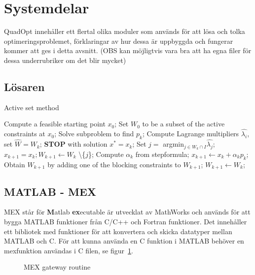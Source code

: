 \section{Systemdelar}
QuadOpt innehåller ett flertal olika moduler som används för att lösa och tolka optimeringsproblemet, förklaringar av hur dessa är uppbyggda och fungerar kommer att ges i detta avsnitt.
(OBS kan möjligtvis vara bra att ha egna filer för dessa underrubriker om det blir mycket)

\subsection{Lösaren}

\begin{algorithm}[H]
\caption{Active set method}
\label{alg:activeset}
\begin{algorithmic}
\State Compute a feasible starting point $x_0$;
\State Set $W_0$ to be a subset of the active constraints at $x_0$;
	\State Solve subproblem to find $p_k$;
		\State Compute Lagrange multipliers $\hat{\lambda_i}$,
		\State set $\hat{W} = W_k$; 
			\State \textbf{STOP} with solution $x^* = x_k$;
		\Else
			\State Set $j =$ argmin$_{j \in W_k \cap I}\hat{\lambda_j}$;
			\State $x_{k+1} = x_k; W_{k+1} \gets W_k$ \textbackslash \{$j$\};		
		\EndIf
	\Else		
		\State Compute $\alpha_k$ from stepformula;
		\State $x_{k+1} \gets x_k + \alpha_k p_k$;
			\State Obtain $W_{k+1}$ by adding one of the blocking constraints to $W_{k+1}$;
		\Else
			\State $W_{k+1} \gets W_k$;	
		\EndIf 	
	\EndIf
\EndFor 
\EndProcedure
\end{algorithmic}
\end{algorithm}

\subsection{MATLAB - MEX} \label{subsec:mex}

MEX står för \textbf{M}atlab \textbf{ex}ecutable är utvecklat av MathWorks och används för att bygga MATLAB funktioner från C/C++ och Fortran funktioner. Det innehåller ett bibliotek med funktioner för att konvertera och skicka datatyper mellan MATLAB och C. För att kunna använda en C funktion i MATLAB behöver en mexfunktion användas i C filen, se figur~\ref{fig:mex2}. 

\begin{figure}[H]

\caption{MEX gateway routine}
\label{fig:mex2}
\end{figure}  

